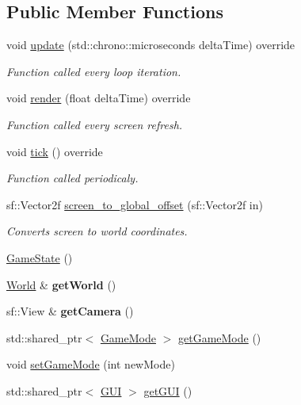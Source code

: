 \subsection*{Public Member Functions}
\begin{DoxyCompactItemize}
\item 
void \hyperlink{classGameState_aba059d7ab1a53b8f5d795292ed37abac}{update} (std\-::chrono\-::microseconds delta\-Time) override
\begin{DoxyCompactList}\small\item\em Function called every loop iteration. \end{DoxyCompactList}\item 
void \hyperlink{classGameState_aa4061260f4ca0acc7d1833dbb6691f0f}{render} (float delta\-Time) override
\begin{DoxyCompactList}\small\item\em Function called every screen refresh. \end{DoxyCompactList}\item 
void \hyperlink{classGameState_ae9ff24d75f36ef56daa6a180d4b38a09}{tick} () override
\begin{DoxyCompactList}\small\item\em Function called periodicaly. \end{DoxyCompactList}\item 
\hypertarget{classGameState_a945e9dfe15e3708799977ed8133f7678}{sf\-::\-Vector2f \hyperlink{classGameState_a945e9dfe15e3708799977ed8133f7678}{screen\-\_\-to\-\_\-global\-\_\-offset} (sf\-::\-Vector2f in)}\label{classGameState_a945e9dfe15e3708799977ed8133f7678}

\begin{DoxyCompactList}\small\item\em Converts screen to world coordinates. \end{DoxyCompactList}\item 
\hyperlink{classGameState_a4fa0a2bf50315c4a35a3890a0adcee5c}{Game\-State} ()
\item 
\hypertarget{classGameState_aebc076f9bcec0aa4317eff9e9a8d566e}{\hyperlink{classWorld}{World} \& {\bfseries get\-World} ()}\label{classGameState_aebc076f9bcec0aa4317eff9e9a8d566e}

\item 
\hypertarget{classGameState_a45607b8a0473073090740500826268c0}{sf\-::\-View \& {\bfseries get\-Camera} ()}\label{classGameState_a45607b8a0473073090740500826268c0}

\item 
std\-::shared\-\_\-ptr$<$ \hyperlink{classGameMode}{Game\-Mode} $>$ \hyperlink{classGameState_a20ec39ca6754c9a78e5142772208b1a6}{get\-Game\-Mode} ()
\item 
void \hyperlink{classGameState_a52d8b4a7e3f778f0858ff53554c89eda}{set\-Game\-Mode} (int new\-Mode)
\item 
\hypertarget{classGameState_a64c8327f5ca1d060867381ecfbfd81c3}{std\-::shared\-\_\-ptr$<$ \hyperlink{classGUI}{G\-U\-I} $>$ \hyperlink{classGameState_a64c8327f5ca1d060867381ecfbfd81c3}{get\-G\-U\-I} ()}\label{classGameState_a64c8327f5ca1d060867381ecfbfd81c3}


\end{DoxyCompactItemize}
